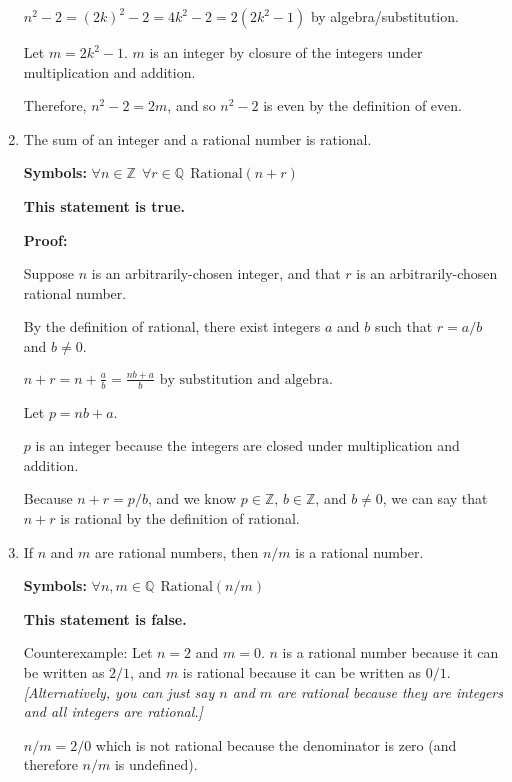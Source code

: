 \documentclass[12pt, letterpaper]{report}
\newcommand{\Z}{\mathbb{Z}}
\newcommand{\Q}{\mathbb{Q}}
\begin{document}
\begin{enumerate}
        $n^2-2 = (2k)^2-2 = 4k^2-2 = 2(2k^2-1)$ by algebra/substitution.
        
        Let $m = 2k^2-1$.  $m$ is an integer by closure of the integers under multiplication and addition.
        
        Therefore, $n^2-2 = 2m$, and so $n^2-2$ is even by the definition of even.
        
        \item The sum of an integer and a rational number is rational.  %
        
          
        
    
        

        
        \textbf{Symbols:} $\forall n \in \Z \ \ \forall r \in \Q \ \ \text{Rational}(n+r)$
        
        \textbf{This statement is true.}
        
        \textbf{Proof:}
        
        Suppose $n$ is an arbitrarily-chosen integer, and that $r$ is an arbitrarily-chosen rational number.
        
        By the definition of rational, there exist integers $a$ and $b$ such that $r=a/b$ and $b\neq 0$.
        
        $\displaystyle n+r = n + \frac{a}{b} = \frac{nb+a}{b}  \text{ \ \ by substitution and algebra.}$
        
        Let $p = nb+a$.  
        
        $p$ is an integer because the integers are closed under multiplication and addition.
                
        Because $n+r = p/b$, and we know $p \in \Z$, $b \in \Z$, and $b \neq 0$, we can say that  $n+r$ is
        rational by the definition of rational.


        
       	\item If $n$ and $m$ are rational numbers, then $n/m$ is a rational number.
	
	\textbf{Symbols:} $\forall n,m \in \Q \ \ \text{Rational}(n/m)$

            \textbf{This statement is false.}
        
        Counterexample: Let $n=2$ and $m=0$.  $n$ is a rational number because it can be written as $2/1$, and $m$ is rational
        because it can be written as $0/1$.  \emph{[Alternatively, you can just say $n$ and $m$ are rational because they are integers
        and all integers are rational.]}
        
        $n/m = 2/0$ which is not rational because the denominator is zero (and therefore $n/m$ is undefined).
                

\end{enumerate}
\end{document}
